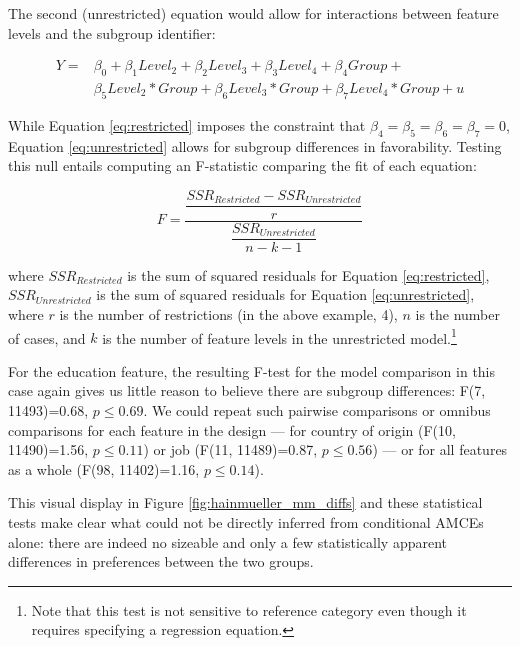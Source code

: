 \documentclass[a4paper,12pt]{article}\usepackage[]{graphicx}\usepackage[]{color}
\begin{document}
\noindent The second (unrestricted) equation would allow for interactions between feature levels and the subgroup identifier:

\begin{equation}\label{eq:unrestricted}
\begin{split}
Y = & \beta_0 + \beta_1 Level_2 + \beta_2 Level_3 + \beta_3 Level_4 + \beta_4 Group + \\
& \beta_5 Level_2 * Group + \beta_6 Level_3 * Group + \beta_7 Level_4 * Group + u
\end{split}
\end{equation}

\noindent While Equation \ref{eq:restricted} imposes the constraint that $\beta_4 = \beta_5 = \beta_6 = \beta_7 = 0$, Equation \ref{eq:unrestricted} allows for subgroup differences in favorability. Testing this null entails computing an F-statistic comparing the fit of each equation:

\begin{equation}
F = \dfrac{\dfrac{SSR_{Restricted} - SSR_{Unrestricted}}{r}}{\dfrac{SSR_{Unrestricted}}{n - k - 1}}
\end{equation}

\noindent where $SSR_{Restricted}$ is the sum of squared residuals for Equation \ref{eq:restricted}, $SSR_{Unrestricted}$ is the sum of squared residuals for Equation \ref{eq:unrestricted}, where $r$ is the number of restrictions (in the above example, 4), $n$ is the number of cases, and $k$ is the number of feature levels in the unrestricted model.\footnote{Note that this test is not sensitive to reference category even though it requires specifying a regression equation.}



For the education feature, the resulting F-test for the model comparison in this case again gives us little reason to believe there are subgroup differences: F(7, 11493)=0.68, $p\leq0.69$. We could repeat such pairwise comparisons or omnibus comparisons for each feature in the design --- for country of origin (F(10, 11490)=1.56, $p\leq0.11$) or job (F(11, 11489)=0.87, $p\leq0.56$) --- or for all features as a whole (F(98, 11402)=1.16, $p\leq0.14$).

This visual display in Figure \ref{fig:hainmueller_mm_diffs} and these statistical tests make clear what could not be directly inferred from conditional AMCEs alone: there are indeed no sizeable and only a few statistically apparent differences in preferences between the two groups.
\end{document}
